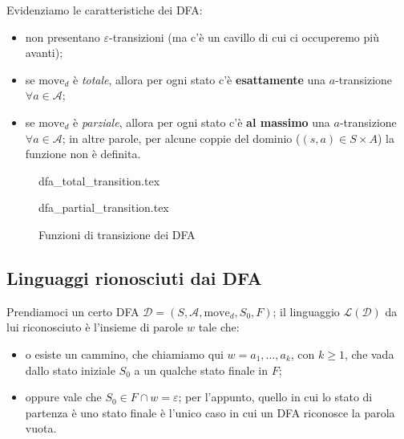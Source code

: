 \documentclass[class=book, crop=false, oneside, 12pt]{standalone}
\begin{document}
Evidenziamo le caratteristiche dei DFA:

\begin{itemize}
    \item non presentano \(\varepsilon\)-transizioni (ma c'è un cavillo di cui ci occuperemo più avanti);
    \item se \(\textrm{move}_d\) è \emph{totale}, allora per ogni stato c'è \textbf{esattamente} una \(a\)-transizione \(\forall a \in \mathcal{A}\);
    \item se \(\textrm{move}_d\) è \emph{parziale}, allora per ogni stato c'è \textbf{al massimo} una \(a\)-transizione \(\forall a \in \mathcal{A}\); in altre parole, per alcune coppie del dominio (\((s,a) \in S \times A\)) la funzione non è definita.
\end{itemize}

\begin{figure}[H]
    \begin{minipage}[b]{0.4\textwidth}
        \centering
        {dfa_total_transition.tex}
    \end{minipage}
    \hfill
    \begin{minipage}[b]{0.4\textwidth}
        \centering
        {dfa_partial_transition.tex}
    \end{minipage}
    \caption{Funzioni di transizione dei DFA}
\end{figure}

\subsection{Linguaggi rionosciuti dai DFA}
Prendiamoci un certo DFA \(\mathcal{D} = (S, \mathcal{A}, \textrm{move}_d, S_0, F)\); il linguaggio \(\mathcal{L(D)}\) da lui riconosciuto è l'insieme di parole \(w\) tale che:

\begin{itemize}
    \item o esiste un cammino, che chiamiamo qui \(w = a_1, \ldots, a_k\), con \(k \ge 1\), che vada dallo stato iniziale \(S_0\) a un qualche stato finale in \(F\);
    \item oppure vale che \(S_0 \in F \cap w = \varepsilon\); per l'appunto, quello in cui lo stato di partenza è uno stato finale è l'unico caso in cui un DFA riconosce la parola vuota.
\end{itemize}
\end{document}
